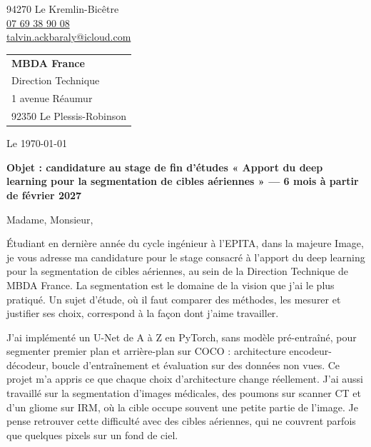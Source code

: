 \documentclass[11pt, a4paper]{extarticle}
\begin{document}
{\color{accent}\fontsize{22}{26}\selectfont\scshape{}}\par\vspace{3pt}
{\setlength{\parskip}{0pt}
94270 Le Kremlin-Bicêtre\\
\href{tel:+33769389008}{\textcolor{ink}{07 69 38 90 08}}\\
\href{mailto:talvin.ackbaraly@icloud.com}{\textcolor{ink}{talvin.ackbaraly@icloud.com}}\par}
\vspace{-4pt}{\color{hair}\rule{\textwidth}{0.4pt}}\par

\vspace{2pt}
\hfill\begin{tabular}[t]{@{}l@{}}
  \textbf{MBDA France}\\
  Direction Technique\\
  1 avenue Réaumur\\
  92350 Le Plessis-Robinson
\end{tabular}

Le \today

\vspace{2pt}
\textbf{Objet : candidature au stage de fin d'études « Apport du deep learning pour la segmentation
de cibles aériennes » — 6 mois à partir de février 2027}

\vspace{2pt}
Madame, Monsieur,


\justifying
Étudiant en dernière année du cycle ingénieur à l'EPITA, dans la majeure Image, je vous adresse
ma candidature pour le stage consacré à l'apport du deep learning pour la segmentation de cibles
aériennes, au sein de la Direction Technique de MBDA France. La segmentation est le domaine de la
vision que j'ai le plus pratiqué. Un sujet d'étude, où il faut comparer des méthodes, les mesurer
et justifier ses choix, correspond à la façon dont j'aime travailler.

J'ai implémenté un U-Net de A à Z en PyTorch, sans modèle pré-entraîné, pour segmenter premier
plan et arrière-plan sur COCO : architecture encodeur-décodeur, boucle d'entraînement et
évaluation sur des données non vues. Ce projet m'a appris ce que chaque choix d'architecture
change réellement. J'ai aussi travaillé sur la segmentation d'images médicales, des poumons sur
scanner CT et d'un gliome sur IRM, où la cible occupe souvent une petite partie de l'image. Je
pense retrouver cette difficulté avec des cibles aériennes, qui ne couvrent parfois que quelques
pixels sur un fond de ciel.
\end{document}

